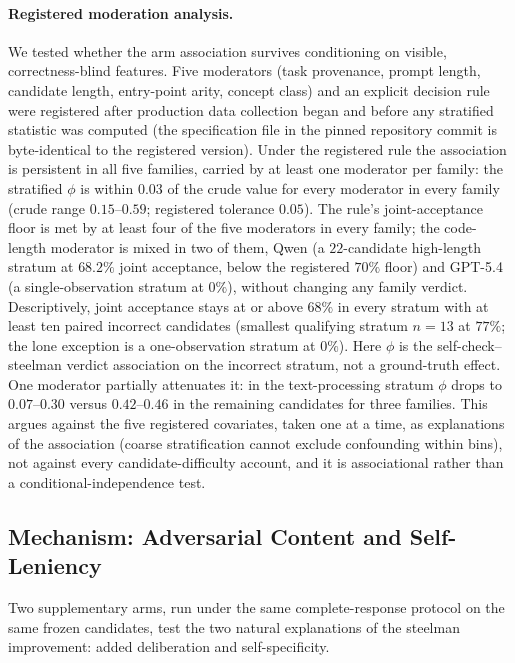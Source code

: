 \documentclass[a4paper,journal]{IAENGtran}
\begin{document}
\paragraph{Registered moderation analysis.} We tested whether the arm association
survives conditioning on visible, correctness-blind features. Five moderators (task
provenance, prompt length, candidate length, entry-point arity, concept class) and an
explicit decision rule were registered after production data collection began and
before any stratified statistic was computed
(the specification file  in the pinned
repository commit is byte-identical to the registered version). Under the registered
rule the association is persistent in all
five families, carried by at least one moderator per family: the stratified $\phi$ is
within $0.03$ of the crude value for every moderator in every family (crude range
$0.15$--$0.59$; registered tolerance $0.05$). The rule's joint-acceptance floor is
met by at least four of the five moderators in every family; the code-length
moderator is mixed in two of them, Qwen (a $22$-candidate high-length stratum at
$68.2\%$ joint acceptance, below the registered $70\%$ floor) and GPT-5.4 (a
single-observation stratum at $0\%$), without changing any family verdict.
Descriptively, joint acceptance stays at or above $68\%$ in every stratum with at
least ten paired incorrect candidates
(smallest qualifying stratum $n=13$ at $77\%$; the lone exception is a
one-observation stratum at $0\%$). Here $\phi$ is the self-check--steelman verdict association
on the incorrect stratum, not a ground-truth effect. One moderator partially attenuates it: in the text-processing
stratum $\phi$ drops to $0.07$--$0.30$ versus $0.42$--$0.46$ in the remaining
candidates for three families. This argues against the five registered covariates, taken one at a time, as
explanations of the association (coarse stratification cannot exclude confounding
within bins), not against every candidate-difficulty account, and
it is associational rather than a conditional-independence test.

\subsection{Mechanism: Adversarial Content and Self-Leniency}
\label{sec:mechanism}

Two supplementary arms, run under the same complete-response protocol on the same
frozen candidates, test the two natural explanations of the steelman improvement: added
deliberation and self-specificity.
\end{document}
